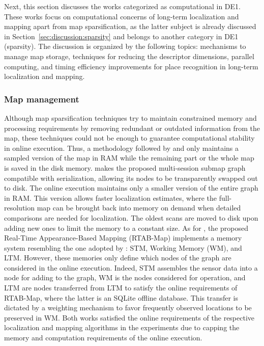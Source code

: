 Next, this section discusses the works categorized as computational in DE1. These works focus on computational concerns of long-term localization and mapping apart from map sparsification, as the latter subject is already discussed in Section~\ref{sec:discussion:sparsity} and belongs to another category in DE1 (sparsity).
The discussion is organized by the following topics: mechanisms to manage map storage, techniques for reducing the descriptor dimensions, parallel computing, and timing efficiency improvements for place recognition in long-term localization and mapping.



\subsubsection{Map management}

Although map sparsification techniques try to maintain constrained memory and processing requirements by removing redundant or outdated information from the map, these techniques could not be enough to guarantee computational stability in online execution. Thus, a methodology followed by \cite{oberländer-et-al:2013:6766479} and \cite{labbé-michaud:2019:21831} only maintains a sampled version of the map in RAM while the remaining part or the whole map is saved in the disk memory.
\cite{oberländer-et-al:2013:6766479} makes the proposed multi-session submap graph compatible with serialization, allowing its nodes to be transparently swapped out to disk. The online execution maintains only a smaller version of the entire graph in RAM. This version allows faster localization estimates, where the full-resolution map can be brought back into memory on demand when detailed comparisons are needed for localization. The oldest scans are moved to disk upon adding new ones to limit the memory to a constant size.
As for \cite{labbé-michaud:2019:21831}, the proposed Real-Time Appearance-Based Mapping (RTAB-Map) implements a memory system resembling the one adopted by \cite{dayoub-et-al:2011:013}: STM, Working Memory (WM), and LTM. However, these memories only define which nodes of the graph are considered in the online execution. Indeed, STM assembles the sensor data into a node for adding to the graph, WM is the nodes considered for operation, and LTM are nodes transferred from LTM to satisfy the online requirements of RTAB-Map, where the latter is an SQLite offline database. This transfer is dictated by a weighting mechanism to favor frequently observed locations to be preserved in WM.
Both works satisfied the online requirements of the respective localization and mapping algorithms in the experiments due to capping the memory and computation requirements of the online execution.

